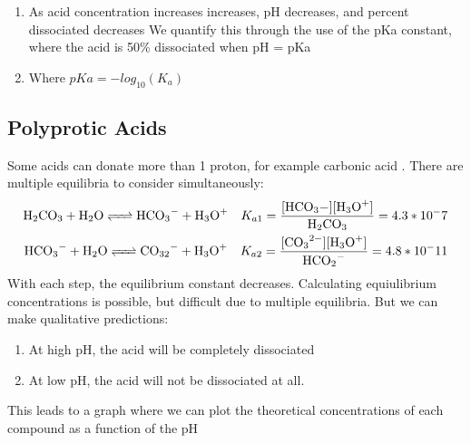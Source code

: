 \documentclass[../CHEM152Notes.tex]{subfiles}
\begin{document}
\begin{enumerate}
    \item As acid concentration increases  increases, pH decreases, and percent dissociated decreases
    We quantify this through the use of the pKa constant, where the acid is 50\% dissociated when pH = pKa 
    \item Where $pKa = -log_{10}(K_a)$
\end{enumerate}

\subsection*{Polyprotic Acids}
Some acids can donate more than 1 proton, for example carbonic acid .
There are multiple equilibria to consider simultaneously:
\begin{equation*}
    \begin{aligned}
        \ce{H2CO3 + H2O <=> HCO3- + H3O+} \quad K_{a1} = \ce{\frac{[HCO3-][H3O+]}{H2CO3}} = 4.3*10^-7  \\
        \ce{HCO3- + H2O <=> CO32- + H3O+} \quad K_{a2} = \ce{\frac{[CO3^2-][H3O+]}{HCO2-}} = 4.8*10^-11 \\
    \end{aligned}
\end{equation*}
With each step, the equilibrium constant decreases. 
\newline 
Calculating equiulibrium concentrations is possible, but difficult due to multiple equilibria. But we can make qualitative predictions:
\begin{enumerate}
    \item At high pH, the acid will be completely dissociated
    \item At low pH, the acid will not be dissociated at all.
\end{enumerate}
This leads to a graph where we can plot the theoretical concentrations of each compound as a function of the pH
\end{document}
